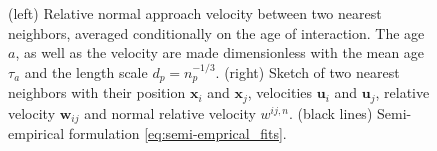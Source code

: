\begin{figure}[h!]
    \centering
    \caption{(left) Relative normal approach velocity between two nearest neighbors, averaged conditionally on the age of interaction.  
    The age $a$, as well as the velocity are made dimensionless  with the mean age $\tau_a$ and the length scale $d_p = n_p^{-1/3}$. 
    (right)
    Sketch of two nearest neighbors with their position $\textbf{x}_i$ and $\textbf{x}_j$, velocities $\textbf{u}_{i}$ and $\textbf{u}_j$, relative velocity $\textbf{w}_{ij}$ and normal relative velocity $w^{ij,n}$. 
    (black lines) Semi-empirical formulation \eqref{eq:semi-emprical_fits}.
    }
    \label{fig:normal_vel_picture}
\end{figure}
